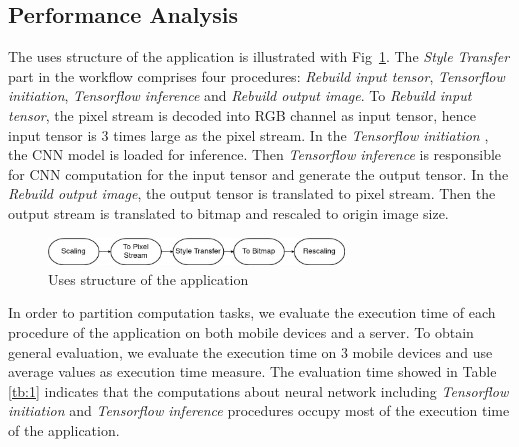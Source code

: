 \documentclass[a4paper,12pt,onecolumn,twoside]{article}
\begin{document}
\begin{CJK*}{GBK}{song}
\subsection{Performance Analysis}

The uses structure of the application is illustrated with Fig~\ref{fig:uses}.
The \emph{Style Transfer} part in the workflow comprises four procedures: 
\textit{Rebuild input tensor}, \textit{Tensorflow initiation}, 
\textit{Tensorflow inference} and \textit{Rebuild output image}.
To \textit{Rebuild input tensor}, the pixel stream is decoded
into RGB channel as input tensor, hence input tensor is 3 times
large as the pixel stream. In the \textit{Tensorflow initiation}
, the CNN model is loaded for inference. 
Then \textit{Tensorflow inference} is responsible for CNN 
computation for the input tensor and generate the output tensor.
In the \textit{Rebuild output image}, 
the output tensor is translated to pixel stream.
Then the output stream is translated to bitmap and rescaled to origin
image size.


\begin{figure}[!htb] %
  \centering %
  \includegraphics[width=0.7\textwidth]{uses} %
  \caption{Uses structure of the application} %
  \label{fig:uses} %
\end{figure}

In order to partition computation tasks,
we evaluate the execution time of each procedure of the application
on both mobile devices and a server. To obtain general evaluation, we
evaluate the execution time on 3 mobile devices and use average
values as execution time measure.
The evaluation time showed in Table \ref{tb:1} indicates that the 
computations about neural network including 
\textit{Tensorflow initiation}
and \textit{Tensorflow inference}\cite{tensorflow2015-whitepaper} 
procedures occupy most of the execution time of the application. 




\end{CJK*}
\end{document}
